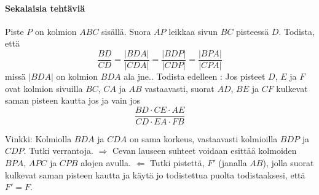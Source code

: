 \begin{tehtavasivu}
\paragraph*{Sekalaisia tehtäviä}



\begin{tehtava}
Piste $P$ on kolmion $ABC$ sisällä. Suora $AP$ leikkaa sivun $BC$ pisteessä $D$. Todista, että
\[
\frac{BD}{CD} = \frac{|BDA|}{|CDA|} = \frac{|BDP|}{|CDP|} = \frac{|BPA|}{|CPA|}
\]
missä $|BDA|$ on kolmion $BDA$ ala jne.. Todista edelleen : Jos pisteet $D$, $E$ ja $F$ ovat kolmion sivuilla $BC$, $CA$ ja $AB$ vastaavasti, suorat $AD$, $BE$ ja $CF$ kulkevat saman pisteen kautta jos ja vain jos
\[
\frac{BD\cdot CE \cdot AE}{CD \cdot EA \cdot FB}
\]
\begin{vastaus}
Vinkki: Kolmiolla $BDA$ ja $CDA$ on sama korkeus, vastaavasti kolmioilla $BDP$ ja $CDP$. Tutki verrantoja. $\Rightarrow$ Cevan lauseen suhteet voidaan esittää kolmoiden $BPA$, $APC$ ja $CPB$ alojen avulla. $\Leftarrow$ Tutki pistettä, $F'$ (janalla $AB$), jolla suorat kulkevat saman pisteen kautta ja käytä jo todistettua puolta todistaaksesi, että $F' = F$.
\end{vastaus}
\end{tehtava}
\end{tehtavasivu}

